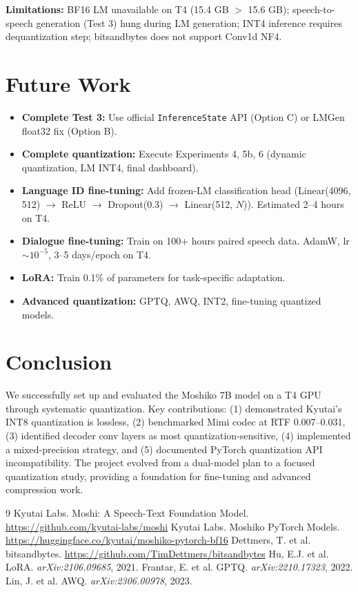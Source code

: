 \documentclass[11pt]{article}
\begin{document}
\textbf{Limitations:} BF16 LM unavailable on T4 (15.4 GB $>$ 15.6 GB); speech-to-speech generation (Test 3) hung during LM generation; INT4 inference requires dequantization step; bitsandbytes does not support Conv1d NF4.

\section{Future Work}
\begin{itemize}[noitemsep,topsep=2pt]
    \item \textbf{Complete Test 3:} Use official \texttt{InferenceState} API (Option C) or LMGen float32 fix (Option B).
    \item \textbf{Complete quantization:} Execute Experiments 4, 5b, 6 (dynamic quantization, LM INT4, final dashboard).
    \item \textbf{Language ID fine-tuning:} Add frozen-LM classification head (Linear(4096, 512) $\rightarrow$ ReLU $\rightarrow$ Dropout(0.3) $\rightarrow$ Linear(512, $N$)). Estimated 2--4 hours on T4.
    \item \textbf{Dialogue fine-tuning:} Train on 100+ hours paired speech data. AdamW, lr $\sim 10^{-5}$, 3--5 days/epoch on T4.
    \item \textbf{LoRA:} Train 0.1\% of parameters for task-specific adaptation.
    \item \textbf{Advanced quantization:} GPTQ, AWQ, INT2, fine-tuning quantized models.
\end{itemize}

\section{Conclusion}
We successfully set up and evaluated the Moshiko 7B model on a T4 GPU through systematic quantization. Key contributions: (1) demonstrated Kyutai's INT8 quantization is lossless, (2) benchmarked Mimi codec at RTF 0.007--0.031, (3) identified decoder conv layers as most quantization-sensitive, (4) implemented a mixed-precision strategy, and (5) documented PyTorch quantization API incompatibility. The project evolved from a dual-model plan to a focused quantization study, providing a foundation for fine-tuning and advanced compression work.

\begin{thebibliography}{9}
 Kyutai Labs. Moshi: A Speech-Text Foundation Model. \url{https://github.com/kyutai-labs/moshi}
 Kyutai Labs. Moshiko PyTorch Models. \url{https://huggingface.co/kyutai/moshiko-pytorch-bf16}
 Dettmers, T. et al. bitsandbytes. \url{https://github.com/TimDettmers/bitsandbytes}
 Hu, E.J. et al. LoRA. \textit{arXiv:2106.09685}, 2021.
 Frantar, E. et al. GPTQ. \textit{arXiv:2210.17323}, 2022.
 Lin, J. et al. AWQ. \textit{arXiv:2306.00978}, 2023.
\end{thebibliography}
\end{document}
